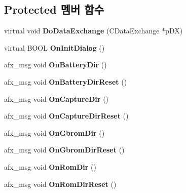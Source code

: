 \subsection*{Protected 멤버 함수}
\begin{DoxyCompactItemize}
\item 
\mbox{\label{class_directories_a1c9309bbbbd233e7d5916f868f1f2671}} 
virtual void {\bfseries Do\+Data\+Exchange} (C\+Data\+Exchange $\ast$p\+DX)
\item 
\mbox{\label{class_directories_a53964c598a5541b1d65cfee62e5d8587}} 
virtual B\+O\+OL {\bfseries On\+Init\+Dialog} ()
\item 
\mbox{\label{class_directories_a31c9021298d9f3a3ea1beabe73ab7685}} 
afx\+\_\+msg void {\bfseries On\+Battery\+Dir} ()
\item 
\mbox{\label{class_directories_a9479f79772b934344110acfccd64a064}} 
afx\+\_\+msg void {\bfseries On\+Battery\+Dir\+Reset} ()
\item 
\mbox{\label{class_directories_a01d34b2ff1d1c0a2a3e638e0cfdd7db7}} 
afx\+\_\+msg void {\bfseries On\+Capture\+Dir} ()
\item 
\mbox{\label{class_directories_a2e98e0696392fcd819f48ac56012c35d}} 
afx\+\_\+msg void {\bfseries On\+Capture\+Dir\+Reset} ()
\item 
\mbox{\label{class_directories_acb13ecb0add4c5e10ed47d40d6a8605c}} 
afx\+\_\+msg void {\bfseries On\+Gbrom\+Dir} ()
\item 
\mbox{\label{class_directories_aa323eb09c0caba8b8e5ff7984fd8e2e6}} 
afx\+\_\+msg void {\bfseries On\+Gbrom\+Dir\+Reset} ()
\item 
\mbox{\label{class_directories_a0ed6f361bde84a4a6a37c41582a929ec}} 
afx\+\_\+msg void {\bfseries On\+Rom\+Dir} ()
\item 
\mbox{\label{class_directories_a944a8a843ab8f0cdec54bf8aaba7d8a5}} 
afx\+\_\+msg void {\bfseries On\+Rom\+Dir\+Reset} ()

\end{DoxyCompactItemize}
